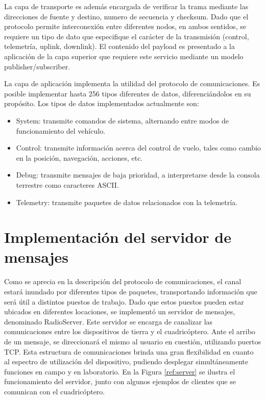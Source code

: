 \documentclass[a4paper, conference]{IEEEtran}
\begin{document}
La capa de transporte es además encargada de verificar la trama mediante las direcciones de fuente y destino, numero de secuencia y checksum. Dado que el protocolo permite interconexión entre diferentes nodos, en ambos sentidos, se requiere un tipo de dato que especifique el carácter de la transmisión (control, telemetría, uplink, downlink). El contenido del payload es presentado a la aplicación de la capa superior que requiere este servicio mediante un modelo publisher/subscriber.

La capa de aplicación implementa la utilidad del protocolo de comunicaciones. Es posible implementar hasta 256 tipos diferentes de datos, diferenciándolos en su propósito. Los tipos de datos implementados actualmente son:
\begin{itemize}
\item System: transmite comandos de sistema, alternando entre modos de funcionamiento del vehículo.
\item Control: transmite información acerca del control de vuelo, tales como cambio en la posición, navegación, acciones, etc.
\item Debug: transmite mensajes de baja prioridad, a interpretarse desde la consola terrestre como caracteres ASCII.
\item Telemetry: transmite paquetes de datos relacionados con la telemetría.
\end{itemize}





\section{Implementación del servidor de mensajes}
Como se aprecia en la descripción del protocolo de comunicaciones, el canal estará inundado por diferentes tipos de paquetes, transportando información que será útil a distintos puestos de trabajo. Dado que estos puestos pueden estar ubicados en diferentes locaciones, se implementó un servidor de mensajes, denominado RadioServer. Este servidor se encarga de canalizar las comunicaciones entre los dispositivos de tierra y el cuadricóptero. Ante el arribo de un mensaje, se direccionará el mismo al usuario en cuestión, utilizando puertos TCP. Esta estructura de comunicaciones brinda una gran flexibilidad en cuanto al espectro de utilización del dispositivo, pudiendo desplegar simultáneamente funciones en campo y en laboratorio.
En la Figura \ref{ref:server} se ilustra el funcionamiento del servidor, junto con algunos ejemplos de clientes que se comunican con el cuadricóptero.
\end{document}

